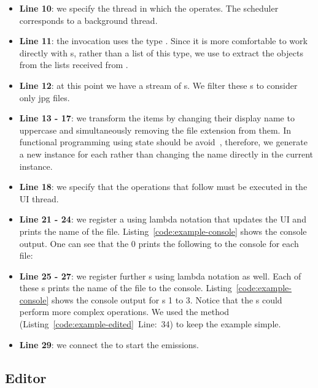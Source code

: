 \documentclass[type=bsc,accentcolor=tud9c]{tudthesis}
\begin{document}
\begin{itemize}
	\item {\bf Line 10}: we specify the thread in which the  operates. The scheduler  corresponds to a background thread.
	\item {\bf Line 11}: the  invocation uses the type . Since it is more comfortable to work directly with s, rather than a list of this type, we use  to extract the  objects from the lists received from .
	\item {\bf Line 12}: at this point we have a stream of s. We filter these s to consider only jpg files.
	\item {\bf Line 13 - 17}: we transform the items by changing their display name to uppercase and simultaneously removing the file extension from them. In functional programming using state should be avoid~\cite{bookFunctionalProgramming}, therefore, we generate a new instance for each  rather than changing the name directly in the current instance. 
	\item {\bf Line 18}: we specify that the operations that follow must be executed in the UI thread.
	\item {\bf Line 21 - 24}: we register a  using lambda notation that updates the UI and prints the name of the file. Listing~\ref{code:example-console} shows the console output. One can see that the  0 prints the following to the console for each file: 
	\item {\bf Line 25 - 27}: we register further s using lambda notation as well. Each of these s prints the name of the file to the console. Listing~\ref{code:example-console} shows the console output for s 1 to 3. Notice that the s could perform more complex operations. We used the method  (Listing~\ref{code:example-edited}~Line:~34) to keep the example simple.
	\item {\bf Line 29}: we connect the  to start the emissions.
\end{itemize}





\newpage
\subsection{Editor}
\end{document}
